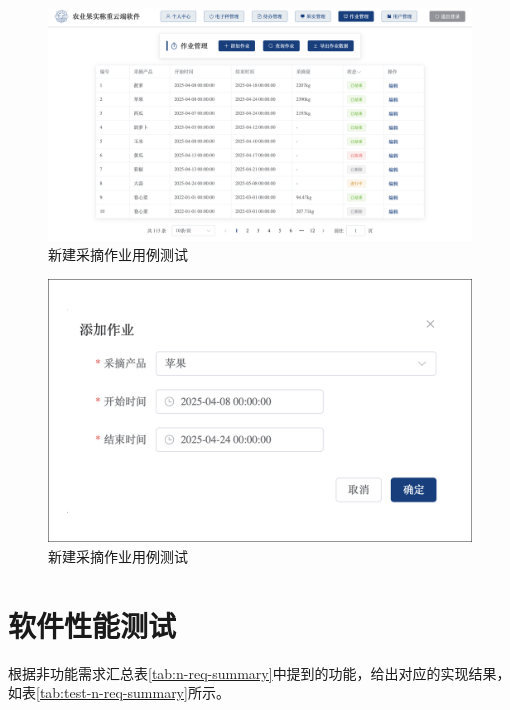\begin{figure}
    \centering
    \includegraphics[width=0.9\linewidth]{../result/web-work.png}
    \caption{新建采摘作业用例测试}
    \label{fig:work-new-result-1}
\end{figure}

\begin{figure}
    \centering
    \includegraphics[width=0.9\linewidth]{../result/form-new-work.png}
    \caption{新建采摘作业用例测试}
    \label{fig:work-new-result-2}
\end{figure}

\section{软件性能测试}

根据非功能需求汇总表\ref{tab:n-req-summary}中提到的功能，给出对应的实现结果，如表\ref{tab:test-n-req-summary}所示。

